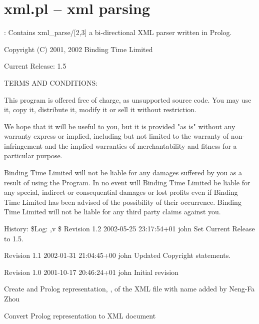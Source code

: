 


\section{xml.pl -- xml parsing}

\label{sec:xml}

 : Contains xml_parse/[2,3] a bi-directional XML parser written in
Prolog.

Copyright (C) 2001, 2002 Binding Time Limited

Current Release: 1.5

TERMS AND CONDITIONS:

This program is offered free of charge, as unsupported source code. You may
use it, copy it, distribute it, modify it or sell it without restriction.

We hope that it will be useful to you, but it is provided "as is" without
any warranty express or implied, including but not limited to the warranty
of non-infringement and the implied warranties of merchantability and fitness
for a particular purpose.

Binding Time Limited will not be liable for any damages suffered by you as
a result of using the Program. In no event will Binding Time Limited be
liable for any special, indirect or consequential damages or lost profits
even if Binding Time Limited has been advised of the possibility of their
occurrence. Binding Time Limited will not be liable for any third party
claims against you.

History:
\$Log: ,v \$
Revision 1.2 2002-05-25 23:17:54+01 john
Set Current Release to 1.5.

Revision 1.1 2002-01-31 21:04:45+00 john
Updated Copyright statements.

Revision 1.0 2001-10-17 20:46:24+01 john
Initial revision\vspace{0.7cm}

\begin{description}
Create and Prolog representation, , of the XML file with name 
added by Neng-Fa Zhou 

Convert Prolog representation to XML document
\end{description}

